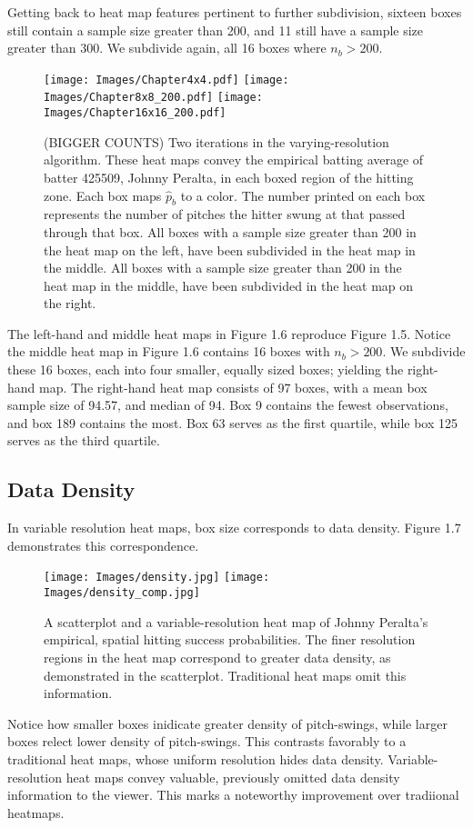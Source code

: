 Getting back to heat map features pertinent to further subdivision, sixteen boxes still contain a sample size greater than 200, and 11 still have a sample size greater than 300. We subdivide again, all 16 boxes where $n_{b} > 200$.
        \begin{figure}[H]
      	\centering
      	\texttt{[image: Images/Chapter4x4.pdf]}
      	\texttt{[image: Images/Chapter8x8\_200.pdf]} 
      	\texttt{[image: Images/Chapter16x16\_200.pdf]} 
      	\caption{(BIGGER COUNTS) Two iterations in the varying-resolution algorithm. These heat maps convey the empirical batting average of batter 425509, Johnny Peralta, in each boxed region of the hitting zone. Each box maps $\hat{p}_{b}$ to a color. The number printed on each box represents the number of pitches the hitter swung at that passed through that box. All boxes with a sample size greater than 200 in the heat map on the left, have been subdivided in the heat map in the middle. All boxes with a sample size greater than 200 in the heat map in the middle, have been subdivided in the heat map on the right.}
      	\end{figure}
The left-hand and middle heat maps in Figure 1.6 reproduce Figure 1.5. Notice the middle heat map in Figure 1.6 contains 16 boxes with $n_{b} > 200$. We subdivide these 16 boxes, each into four smaller, equally sized boxes; yielding the right-hand map. The right-hand heat map consists of 97 boxes, with a mean box sample size of 94.57, and median of 94. Box 9 contains the fewest observations, and box 189 contains the most. Box 63 serves as the first quartile, while box 125 serves as the third quartile. 

\subsection{Data Density}

In variable resolution heat maps, box size corresponds to data density. Figure 1.7 demonstrates this correspondence. 
        \begin{figure}[H]
      	\centering
      	\texttt{[image: Images/density.jpg]}
      	\texttt{[image: Images/density\_comp.jpg]} 
      	\caption{A scatterplot and a variable-resolution heat map of Johnny Peralta's empirical, spatial hitting success probabilities. The finer resolution regions in the heat map correspond to greater data density, as demonstrated in the scatterplot. Traditional heat maps omit this information.}
      	\end{figure}
Notice how smaller boxes inidicate greater density of pitch-swings, while larger boxes relect lower density of pitch-swings. This contrasts favorably to a traditional heat maps, whose uniform resolution hides data density. Variable-resolution heat maps convey valuable, previously omitted data density information to the viewer. This marks a noteworthy improvement over tradiional heatmaps.

